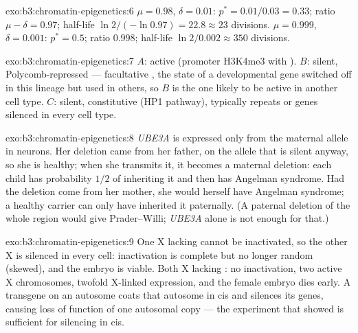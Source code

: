 \begin{solution}{exo:b3:chromatin-epigenetics:6}
$\mu = 0.98$, $\delta = 0.01$: $p^{*} = 0.01/0.03 = 0.33$; ratio $\mu -
\delta = 0.97$; half-life $\ln 2/(-\ln 0.97) = 22.8 \approx 23$
divisions. $\mu = 0.999$, $\delta = 0.001$: $p^{*} = 0.5$; ratio
$0.998$; half-life $\ln 2 / 0.002 \approx 350$ divisions.
\end{solution}

\begin{solution}{exo:b3:chromatin-epigenetics:7}
$A$: active (promoter H3K4me3 with ). $B$: silent,
Polycomb-repressed --- facultative , the state of a
developmental gene switched off in this lineage but used in others, so
$B$ is the one likely to be active in another cell type. $C$: silent,
constitutive  (HP1 pathway), typically repeats or genes
silenced in every cell type.
\end{solution}

\begin{solution}{exo:b3:chromatin-epigenetics:8}
\emph{UBE3A} is expressed only from the maternal allele in neurons. Her
deletion came from her father, on the allele that is silent anyway, so
she is healthy; when she transmits it, it becomes a maternal deletion:
each child has probability $1/2$ of inheriting it and then has Angelman
syndrome. Had the deletion come from her mother, she would herself have
Angelman syndrome; a healthy carrier can only have inherited it
paternally. (A paternal deletion of the whole region would give
Prader--Willi; \emph{UBE3A} alone is not enough for that.)
\end{solution}

\begin{solution}{exo:b3:chromatin-epigenetics:9}
One X lacking \emph{} cannot be inactivated, so the other X is
silenced in every cell: inactivation is complete but no longer random
(skewed), and the embryo is viable. Both X lacking \emph{}: no
inactivation, two active X chromosomes, twofold X-linked expression, and
the female embryo dies early. A \emph{} transgene on an autosome
coats that autosome in cis and silences its genes, causing loss of
function of one autosomal copy --- the experiment that showed
\emph{} is sufficient for silencing in cis.
\end{solution}

